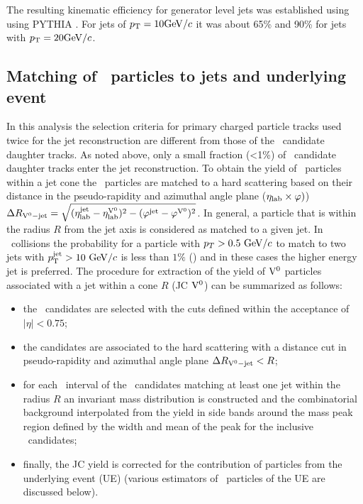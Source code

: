 
The resulting kinematic efficiency for generator level jets was established using using PYTHIA \cite{PYTHIA}. For jets of $p_{\mathrm{T}}=10\mathrm{GeV}/c$ it was about 65\% and 90\% for jets with $p_{\mathrm{T}} =20\mathrm{GeV}/c$. 


\subsection{Matching of \Vzero\ particles to jets and underlying event}
\label{sec:c05V0JetMat}

In this analysis the selection criteria for primary charged particle tracks used twice for the jet reconstruction are different from those of the \Vzero\ candidate daughter tracks.
As noted above, only a small fraction (<1\%) of \Vzero\ candidate daughter tracks enter the jet reconstruction. 
To obtain the yield of \Vzero\ particles within a jet cone the \Vzero\ particles are matched to a hard scattering based on their distance in the pseudo-rapidity and azimuthal angle plane ($\eta_{\rm lab} \times \varphi)$) $\Delta R_{{\rm V}^{0}-{\rm jet}}=\sqrt{(\eta_{\rm lab}^{\rm jet} - \eta_{\rm lab}^{{\rm V}^{0}})^{2} - (\varphi^{\rm jet} - \varphi^{{\rm V}^{0}})^{2}}$. 
In general, a particle that is within the radius $R$ from the jet axis is considered as matched to a given jet. 
In \pPb\ collisions the probability for a particle with $p_{T}>0.5~\mathrm{GeV}/c$ to match to two jets with $p_{\mathrm{T}}^{\mathrm{jet}} > 10~\mathrm{GeV}/c$ is less than $1\%$ () and in these cases the higher energy jet is preferred.
The procedure for extraction of the yield of ${\rm V}^{0}$ particles associated with a jet within a cone $R$ (JC ${\rm V}^{0}$) can be summarized as follows:

\begin{itemize}
\item the \Vzero\ candidates are selected with the cuts defined within the acceptance of $|\eta|<0.75$;
\item the candidates are associated to the hard scattering with a distance cut in pseudo-rapidity and azimuthal angle plane $\Delta R_{{\rm V}^{0}-{\rm jet}}<R$;
\item for each \pt\ interval of the \Vzero\ candidates matching at least one jet within the radius $R$ an invariant mass distribution is constructed and the combinatorial background interpolated from the yield in side bands around the mass peak region defined by the width and mean of the peak for the inclusive \Vzero\ candidates;
\item finally, the JC yield is corrected for the contribution of particles from the underlying event (UE) (various estimators of \Vzero\ particles of the UE are discussed below). %
\end{itemize}

